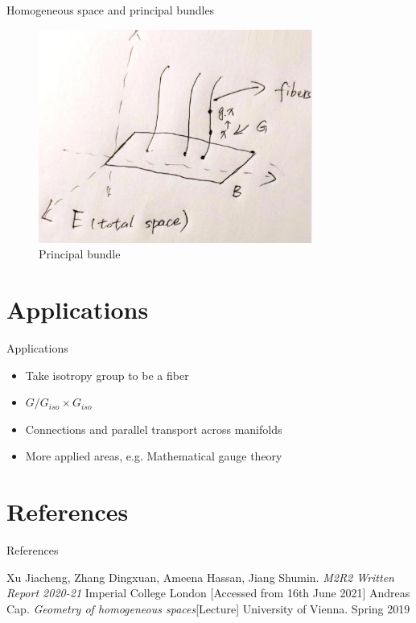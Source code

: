 \documentclass[smaller,xcolor=dvipsnames]{beamer}
\begin{document}
\begin{frame}{Homogeneous space and principal bundles}
\begin{figure}[tb]
\centering
\includegraphics[width=90mm]{princ bun.png} 
\caption{Principal bundle}
\end{figure}
\end{frame}

\section{Applications}
\begin{frame}{Applications}
    \begin{itemize}
        \item Take isotropy group to be a fiber
        \item $G/G_{iso} \times G_{iso}$\\
        \pause
        \item Connections and parallel transport across manifolds\\
        \pause
        \item More applied areas, e.g. Mathematical gauge theory
    \end{itemize}
\end{frame}


\section{References}
\begin{frame}{References}
\begin{thebibliography}{999}
Xu Jiacheng, Zhang Dingxuan, Ameena Hassan, Jiang Shumin. \textit{M2R2 Written Report 2020-21} Imperial College London [Accessed from 16th June 2021]
Andreas Cap. \textit{Geometry of homogeneous spaces}[Lecture] University of Vienna. Spring 2019
\end{thebibliography}
\end{frame}
\end{document}
